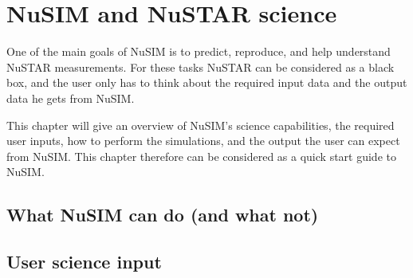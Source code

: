 \chapter{NuSIM and NuSTAR science}

One of the main goals of NuSIM is to predict, reproduce, and help understand NuSTAR measurements.
For these tasks NuSTAR can be considered as a black box, and the user only has to think about the required input data and the output data he gets from NuSIM. 

This chapter will give an overview of NuSIM's science capabilities, the required user inputs, how to perform the simulations, and the output the user can expect from NuSIM. This chapter therefore can be considered as a quick start guide to NuSIM.

\section{What NuSIM can do (and what not)}



\section{User science input}

